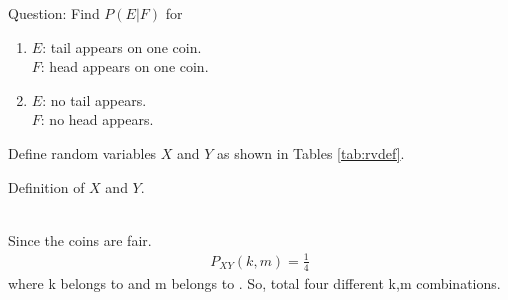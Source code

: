 \documentclass[journal,11pt,twocolumn]{IEEEtran}
\begin{document}
Question: Find $P(E|F)$ for
\begin{enumerate}
\item$E$: tail appears on one coin.\\
   $F$: head appears on one coin.
\item$E$: no tail appears.\\
    $F$: no head appears.
\end{enumerate}
\solution 
Define random variables $X$ and $Y$ as shown in Tables \ref{tab:rvdef}.
\begin{table}[!ht]
\centering

\caption{Definition of $X$ and $Y$.}
\label{tab:rvdef}
\end{table}\\
    Since the coins are fair.
\begin{align}
P_{XY}(k,m)=\frac{1}{4}
\label{eq:12.13.1.7,1}
\end{align}
where k belongs to  and m belongs to . So, total four different k,m combinations.
\end{document}
